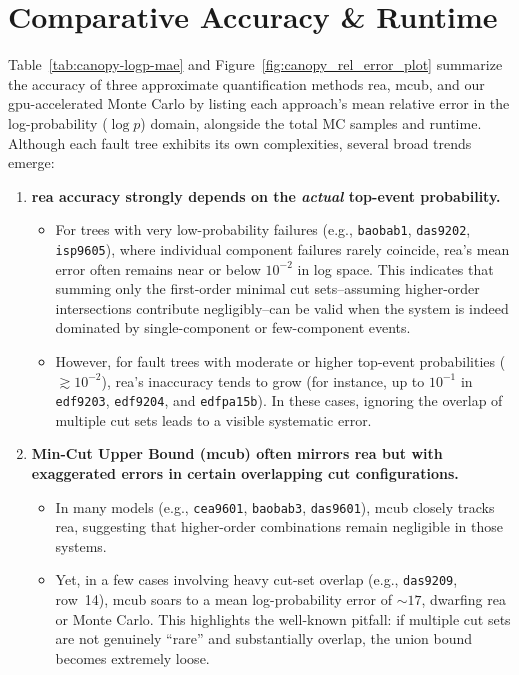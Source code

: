 \section{Comparative Accuracy \& Runtime}

Table~\ref{tab:canopy-logp-mae} and Figure~\ref{fig:canopy_rel_error_plot} summarize the accuracy of three approximate quantification methods \acrfull{rea}, \acrfull{mcub}, and our \acrshort{gpu}-accelerated Monte Carlo by listing each approach's mean relative error in the log-probability (\(\log p\)) domain, alongside the total MC samples and runtime. Although each fault tree exhibits its own complexities, several broad trends emerge:

\begin{enumerate}
    \item \textbf{\acrshort{rea} accuracy strongly depends on the \emph{actual} top-event probability.}
    \begin{itemize}
        \item For trees with very low-probability failures (e.g., \texttt{baobab1}, \texttt{das9202}, \texttt{isp9605}), where individual component failures rarely coincide, \acrshort{rea}'s mean error often remains near or below \(10^{-2}\) in log space. This indicates that summing only the first-order minimal cut sets--assuming higher-order intersections contribute negligibly--can be valid when the system is indeed dominated by single-component or few-component events.
        \item However, for fault trees with moderate or higher top-event probabilities (\(\gtrsim 10^{-2}\)), \acrshort{rea}'s inaccuracy tends to grow (for instance, up to \(10^{-1}\) in \texttt{edf9203}, \texttt{edf9204}, and \texttt{edfpa15b}). In these cases, ignoring the overlap of multiple cut sets leads to a visible systematic error.
    \end{itemize}

    \item \textbf{Min-Cut Upper Bound (\acrshort{mcub}) often mirrors \acrshort{rea} but with exaggerated errors in certain overlapping cut configurations.}
    \begin{itemize}
        \item In many models (e.g., \texttt{cea9601}, \texttt{baobab3}, \texttt{das9601}), \acrshort{mcub} closely tracks \acrshort{rea}, suggesting that higher-order combinations remain negligible in those systems.
        \item Yet, in a few cases involving heavy cut-set overlap (e.g., \texttt{das9209}, row~14), \acrshort{mcub} soars to a mean log-probability error of \(\sim 17\), dwarfing \acrshort{rea} or Monte Carlo. This highlights the well-known pitfall: if multiple cut sets are not genuinely ``rare'' and substantially overlap, the union bound becomes extremely loose.
    \end{itemize}


\end{enumerate}
